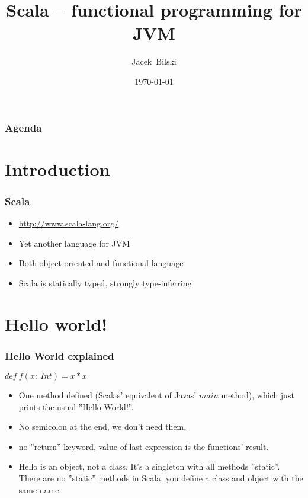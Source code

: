 \documentclass[xcolor=dvipsnames]{beamer}
\title{Scala -- functional programming for JVM}
\author{Jacek~Bilski}
\date{\today}
\begin{document}
\begin{frame}
\titlepage
\end{frame}

\begin{frame}
\frametitle{Agenda}
\tableofcontents[pausesections]
\end{frame}

\section{Introduction}

\begin{frame}
\frametitle{Scala}
\begin{itemize}
\item \href{http://www.scala-lang.org/}{http://www.scala-lang.org/}
\item Yet another language for JVM
\item Both object-oriented and functional language
\item Scala is statically typed, strongly type-inferring
\end{itemize}
\end{frame}

\section{Hello world!}


\begin{frame}
\frametitle{Hello World explained}
$def\:f(x:\:Int) = x * x$
\begin{itemize}
\item One method defined (Scalas' equivalent of Javas' $main$ method), which just prints the usual ''Hello World!''.
\item No semicolon at the end, we don't need them.
\item no ''return'' keyword, value of last expression is the functions' result.
\item Hello is an object, not a class. It's a singleton with all methods ''static''. There are no ''static'' methods in Scala, you define a class and object with the same name.
\end{itemize}
\end{frame}
\end{document}
